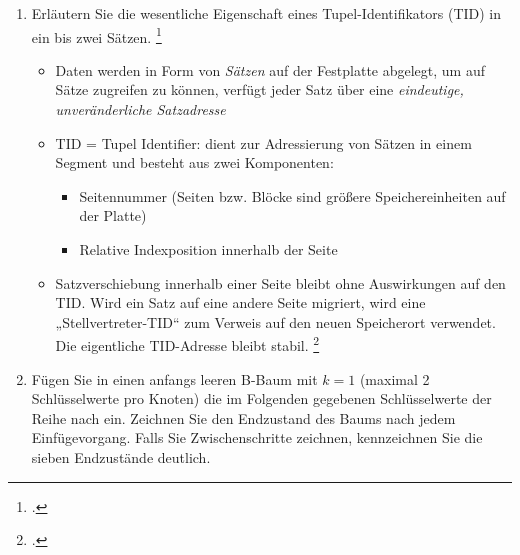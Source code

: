 \documentclass{bschlangaul-aufgabe}
\begin{document}

\begin{enumerate}


\item Erläutern Sie die wesentliche Eigenschaft eines
Tupel-Identifikators (TID) in ein bis zwei Sätzen.
\footcite{66114:2016:09}

\begin{bAntwort}
\begin{itemize}
\item Daten werden in Form von \emph{Sätzen} auf der Festplatte
abgelegt, um auf Sätze zugreifen zu können, verfügt jeder Satz über eine
\emph{eindeutige, unveränderliche Satzadresse}

\item TID = Tupel Identifier: dient zur Adressierung von Sätzen in einem
Segment und besteht aus zwei Komponenten:

\begin{itemize}
\item Seitennummer (Seiten bzw. Blöcke sind größere Speichereinheiten
auf der Platte)

\item Relative Indexposition innerhalb der Seite
\end{itemize}

\item Satzverschiebung innerhalb einer Seite bleibt ohne Auswirkungen
auf den TID. Wird ein Satz auf eine andere Seite migriert, wird eine
„Stellvertreter-TID“ zum Verweis auf den neuen Speicherort verwendet.
Die eigentliche TID-Adresse bleibt stabil.
\footcite[Seite 219]{kemper}
\end{itemize}
\end{bAntwort}


\item Fügen Sie in einen anfangs leeren B-Baum mit $k = 1$ (maximal 2
Schlüsselwerte pro Knoten) die im Folgenden gegebenen Schlüsselwerte der
Reihe nach ein. Zeichnen Sie den Endzustand des Baums nach jedem
Einfügevorgang. Falls Sie Zwischenschritte zeichnen, kennzeichnen Sie
die sieben Endzustände deutlich.


\end{enumerate}
\end{document}
